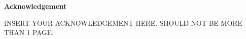 \textbf{Acknowledgement} \par
\vspace{0.5cm}
INSERT YOUR ACKNOWLEDGEMENT HERE. SHOULD NOT BE MORE THAN 1 PAGE.